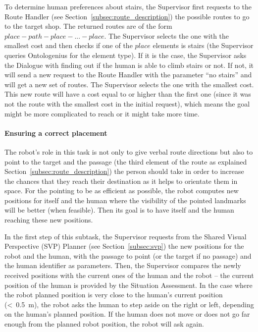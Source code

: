 \documentclass[a4paper,11pt,twoside]{StyleThese}
\begin{document}
To determine human preferences about stairs, the Supervisor first requests to the Route Handler (see Section~\ref{subsec:route_description}) the possible routes to go to the target shop. The returned routes are of the form $place - path - place - ... - place$. The Supervisor selects the one with the smallest cost and then checks if one of the $place$ elements is stairs (\ie the Supervisor queries Ontologenius for the element type). If it is the case, the Supervisor asks the Dialogue with finding out if the human is able to climb stairs or not. If not, it will send a new request to the Route Handler with the parameter ``no stairs'' and will get a new set of routes. The Supervisor selects the one with the smallest cost. This new route will have a cost equal to or higher than the first one (since it was not the route with the smallest cost in the initial request), which means the goal might be more complicated to reach or it might take more time.

\paragraph{Ensuring a correct placement}
The robot's role in this task is not only to give verbal route directions but also to point to the target and the passage (\ie the third element of the route as explained Section~\ref{subsec:route_description}) the person should take in order to increase the chances that they reach their destination as it helps to orientate them in space. For the pointing to be as efficient as possible, the robot computes new positions for itself and the human where the visibility of the pointed landmarks will be better (when feasible). Then its goal is to have itself and the human reaching these new positions. 

In the first step of this subtask, the Supervisor requests from the Shared Visual Perspective (SVP) Planner (see Section~\ref{subsec:svp}) the new positions for the robot and the human, with the passage to point (or the target if no passage) and the human identifier as parameters. Then, the Supervisor compares the newly received positions with the current ones of the human and the robot -- the current position of the human is provided by the Situation Assessment. In the case where the robot planned position is very close to the human's current position (\textless~0.5~m), the robot asks the human to step aside on the right or left, depending on the human's planned position. If the human does not move or does not go far enough from the planned robot position, the robot will ask again.
\end{document}
